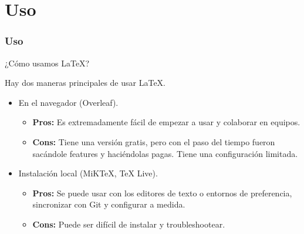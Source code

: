 \section{Uso}\label{sec:uso}

\begin{frame}
\frametitle{Uso}
    \begin{tcolorbox}[colframe=color1]
        \begin{center}
            ¿Cómo usamos \LaTeX ?
        \end{center}
    \end{tcolorbox}

    Hay dos maneras principales de usar \LaTeX{}. 
    \begin{itemize}
        \item En el navegador (Overleaf).
        \begin{itemize}
            \item \textbf{Pros:} Es extremadamente fácil de empezar a usar y colaborar en equipos.
            \item \textbf{Cons:} Tiene una versión gratis, pero con el paso del tiempo fueron sacándole features y haciéndolas pagas. Tiene una configuración limitada.
        \end{itemize}
        \item Instalación local (MiKTeX, TeX Live).
        \begin{itemize}
            \item \textbf{Pros:} Se puede usar con los editores de texto o entornos de preferencia, sincronizar con Git y configurar a medida.
            \item \textbf{Cons:} Puede ser difícil de instalar y troubleshootear.
        \end{itemize}
        
    \end{itemize}
    
\end{frame}